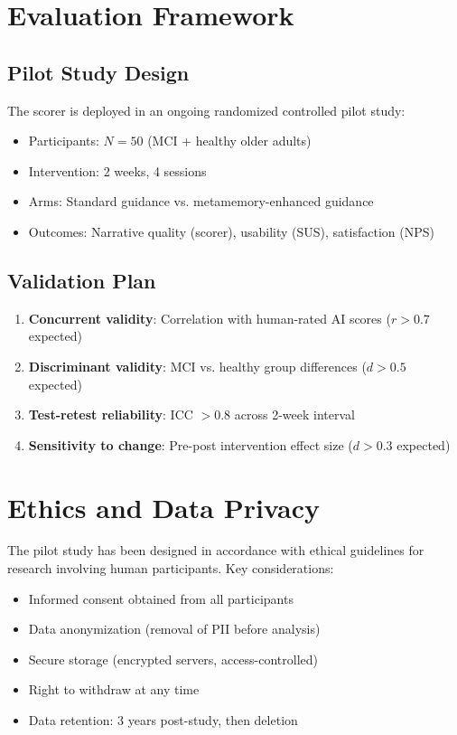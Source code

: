 \documentclass[11pt]{article}
\begin{document}
\section{Evaluation Framework}

\subsection{Pilot Study Design}

The scorer is deployed in an ongoing randomized controlled pilot study:
\begin{itemize}
  \item Participants: $N = 50$ (MCI + healthy older adults)
  \item Intervention: 2 weeks, 4 sessions
  \item Arms: Standard guidance vs. metamemory-enhanced guidance
  \item Outcomes: Narrative quality (scorer), usability (SUS), satisfaction (NPS)
\end{itemize}

\subsection{Validation Plan}

\begin{enumerate}
  \item \textbf{Concurrent validity}: Correlation with human-rated AI scores ($r > 0.7$ expected)
  \item \textbf{Discriminant validity}: MCI vs. healthy group differences ($d > 0.5$ expected)
  \item \textbf{Test-retest reliability}: ICC $> 0.8$ across 2-week interval
  \item \textbf{Sensitivity to change}: Pre-post intervention effect size ($d > 0.3$ expected)
\end{enumerate}

\section{Ethics and Data Privacy}

The pilot study has been designed in accordance with ethical guidelines for research involving human participants. Key considerations:

\begin{itemize}
  \item Informed consent obtained from all participants
  \item Data anonymization (removal of PII before analysis)
  \item Secure storage (encrypted servers, access-controlled)
  \item Right to withdraw at any time
  \item Data retention: 3 years post-study, then deletion
\end{itemize}
\end{document}
